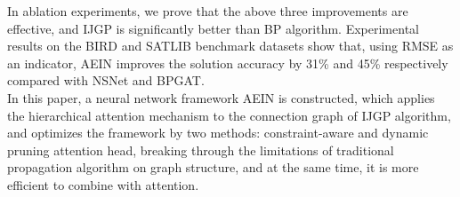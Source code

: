 In ablation experiments, we prove that the above three improvements are effective, and IJGP is significantly 
better than BP algorithm. Experimental results on the BIRD and SATLIB benchmark datasets show that, using RMSE 
as an indicator, AEIN improves the solution accuracy by 31\% and 45\% respectively compared with NSNet and BPGAT.\\

In this paper, a neural network framework AEIN is constructed, which applies the hierarchical attention mechanism 
to the connection graph of IJGP algorithm, and optimizes the framework by two methods: constraint-aware and 
dynamic pruning attention head, breaking through the limitations of traditional propagation algorithm on graph 
structure, and at the same time, it is more efficient to combine with attention.
